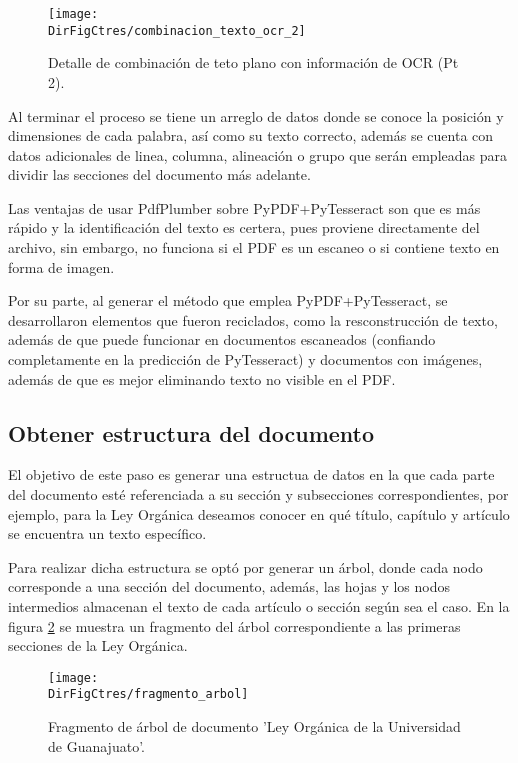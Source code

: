 \begin{figure}[]
    \centering
    \texttt{[image: \\DirFigCtres/combinacion\_texto\_ocr\_2]}
    \caption{Detalle de combinación de teto plano con información de OCR (Pt 2).}
    \label{fig:esquema_combinacion_txt_ocr_2}
\end{figure}

Al terminar el proceso se tiene un arreglo de datos donde se conoce la posición
y dimensiones de cada palabra, así como su texto correcto, además se cuenta con
datos adicionales de linea, columna, alineación o grupo que serán empleadas
para dividir las secciones del documento más adelante.

Las ventajas de usar PdfPlumber sobre PyPDF+PyTesseract son que es más rápido y
la identificación del texto es certera, pues proviene directamente del archivo,
sin embargo, no funciona si el PDF es un escaneo o si contiene texto en forma
de imagen.

Por su parte, al generar el método que emplea PyPDF+PyTesseract, se desarrollaron
elementos que fueron reciclados, como la resconstrucción de texto, además de
que puede funcionar en documentos escaneados (confiando completamente en la
predicción de PyTesseract) y documentos con imágenes, además de que es mejor
eliminando texto no visible en el PDF.

\subsection{Obtener estructura del documento}

El objetivo de este paso es generar una estructua de datos en la que cada parte
del documento esté referenciada a su sección y subsecciones correspondientes,
por ejemplo, para la Ley Orgánica deseamos conocer en qué título, capítulo y
artículo se encuentra un texto específico.

Para realizar dicha estructura se optó por generar un árbol, donde cada nodo
corresponde a una sección del documento, además, las hojas y los nodos intermedios
almacenan el texto de cada artículo o sección según sea el caso. En la figura
\ref{fig:fragmento_arbol} se muestra un fragmento del árbol correspondiente a
las primeras secciones de la Ley Orgánica.

\begin{figure}[]
    \centering
    \texttt{[image: \\DirFigCtres/fragmento\_arbol]}
    \caption{Fragmento de árbol de documento 'Ley Orgánica de la Universidad de Guanajuato'.}
    \label{fig:fragmento_arbol}
\end{figure}

